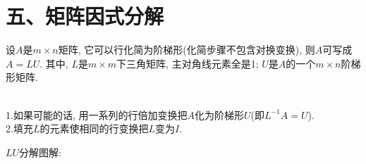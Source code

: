 \section{五、矩阵因式分解}
设$A$是$m\times n$矩阵, 它可以行化简为阶梯形(化简步骤不包含对换变换), 则$A$可写成$A=LU$. 其中, $L$是$m\times m$下三角矩阵, 主对角线元素全是1; $U$是$A$的一个$m\times n$阶梯形矩阵.\\[2ex]

\begin{law}[$LU$分解的算法]\ \\
1.如果可能的话, 用一系列的行倍加变换把$A$化为阶梯形$U$(即$L^{-1}A=U$).\\
2.填充$L$的元素使相同的行变换把$L$变为$I$.
\end{law}\vspace{4ex}

$LU$分解图解:\\
